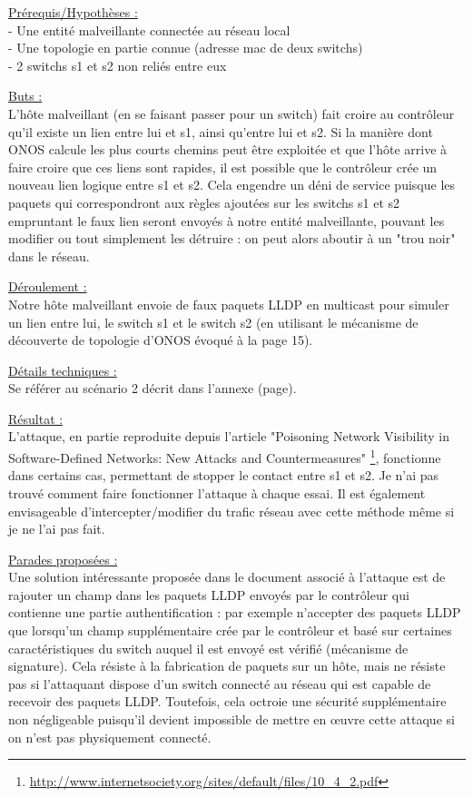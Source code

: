 \underline{Prérequis/Hypothèses :}\\
- Une entité malveillante connectée au réseau local\\
- Une topologie en partie connue (adresse mac de deux switchs)\\
- 2 switchs s1 et s2 non reliés entre eux


\underline{Buts :}\\
L’hôte malveillant (en se faisant passer pour un switch) fait croire au contrôleur qu’il existe un lien entre lui et s1, ainsi qu’entre lui et s2. Si la manière dont ONOS calcule les plus courts chemins peut être exploitée et que l'hôte arrive à faire croire que ces liens sont rapides, il est possible que le contrôleur crée un nouveau lien logique entre s1 et s2. Cela engendre un déni de service puisque les paquets qui correspondront aux règles ajoutées sur les switchs s1 et s2 empruntant le faux lien seront envoyés à notre entité malveillante, pouvant les modifier ou tout simplement les détruire : on peut alors aboutir à un "trou noir" dans le réseau.

\underline{Déroulement :}\\
Notre hôte malveillant envoie de faux paquets LLDP en multicast pour simuler un lien entre lui, le switch s1 et le switch s2 (en utilisant le mécanisme de découverte de topologie d'ONOS évoqué à la page 15).

\underline{Détails techniques :}\\
Se référer au scénario 2 décrit dans l'annexe (page).

\underline{Résultat :}\\
L'attaque, en partie reproduite depuis l'article "Poisoning Network Visibility in Software-Defined Networks: New Attacks and Countermeasures" \footnote{\url{http://www.internetsociety.org/sites/default/files/10_4_2.pdf}}, fonctionne dans certains cas, permettant de stopper le contact entre s1 et s2. Je n'ai pas trouvé comment faire fonctionner l'attaque à chaque essai. Il est également envisageable d'intercepter/modifier du trafic réseau avec cette méthode même si je ne l'ai pas fait.

\underline{Parades proposées :}\\
Une solution intéressante proposée dans le document associé à l’attaque est de rajouter un champ dans les paquets LLDP envoyés par le contrôleur qui contienne une partie authentification : par exemple n’accepter des paquets LLDP que lorsqu’un champ supplémentaire crée par le contrôleur et basé sur certaines caractéristiques du switch auquel il est envoyé est vérifié (mécanisme de signature). Cela résiste à la fabrication de paquets sur un hôte, mais ne résiste pas si l’attaquant dispose d’un switch connecté au réseau qui est capable de recevoir des paquets LLDP. Toutefois, cela octroie une sécurité supplémentaire non négligeable puisqu’il devient impossible de mettre en œuvre cette attaque si on n’est pas physiquement connecté.

